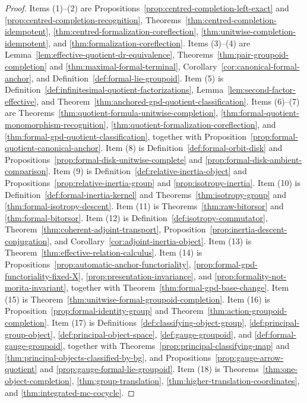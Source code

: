 \begin{proof}
Items (1)--(2) are
Propositions~\ref{prop:centred-completion-left-exact} and
\ref{prop:centred-completion-recognition},
Theorems~\ref{thm:centred-completion-idempotent},
\ref{thm:centred-formalization-coreflection},
\ref{thm:unitwise-completion-idempotent}, and
\ref{thm:formalization-coreflection}.
Items (3)--(4) are
Lemma~\ref{lem:effective-quotient-dr-equivalence},
Theorems~\ref{thm:pair-groupoid-completion} and
\ref{thm:maximal-formal-terminal},
Corollary~\ref{cor:canonical-formal-anchor}, and
Definition~\ref{def:formal-lie-groupoid}.
Item (5) is
Definition~\ref{def:infinitesimal-quotient-factorizations},
Lemma~\ref{lem:second-factor-effective}, and
Theorem~\ref{thm:anchored-gpd-quotient-classification}.
Items (6)--(7) are
Theorems~\ref{thm:quotient-formula-unitwise-completion},
\ref{thm:formal-quotient-monomorphism-recognition},
\ref{thm:quotient-formalization-coreflection}, and
\ref{thm:formal-gpd-quotient-classification}, together with
Proposition~\ref{prop:formal-quotient-canonical-anchor}.
Item (8) is
Definition~\ref{def:formal-orbit-disk} and
Propositions~\ref{prop:formal-disk-unitwise-complete} and
\ref{prop:formal-disk-ambient-comparison}.
Item (9) is
Definition~\ref{def:relative-inertia-object} and
Propositions~\ref{prop:relative-inertia-group} and
\ref{prop:isotropy-inertia}.
Item (10) is
Definition~\ref{def:formal-inertia-kernel} and
Theorems~\ref{thm:isotropy-group} and
\ref{thm:formal-isotropy-descent}.
Item (11) is
Theorems~\ref{thm:raw-bitorsor} and
\ref{thm:formal-bitorsor}.
Item (12) is
Definition~\ref{def:isotropy-commutator},
Theorem~\ref{thm:coherent-adjoint-transport},
Proposition~\ref{prop:inertia-descent-conjugation}, and
Corollary~\ref{cor:adjoint-inertia-object}.
Item (13) is
Theorem~\ref{thm:effective-relation-calculus}.
Item (14) is
Propositions~\ref{prop:automatic-anchor-functoriality},
\ref{prop:formal-gpd-functoriality-fixed-X},
\ref{prop:presentation-invariance}, and
\ref{prop:formality-not-morita-invariant}, together with
Theorem~\ref{thm:formal-gpd-base-change}.
Item (15) is
Theorem~\ref{thm:unitwise-formal-groupoid-completion}.
Item (16) is
Proposition~\ref{prop:formal-identity-group} and
Theorem~\ref{thm:action-groupoid-completion}.
Item (17) is
Definitions~\ref{def:classifying-object-group},
\ref{def:principal-group-object},
\ref{def:principal-object-space},
\ref{def:gauge-groupoid}, and
\ref{def:formal-gauge-groupoid}, together with
Theorems~\ref{prop:principal-classifying-map} and
\ref{thm:principal-objects-classified-by-bg}, and
Propositions~\ref{prop:gauge-arrow-quotient} and
\ref{prop:gauge-formal-lie-groupoid}.
Item (18) is
Theorems~\ref{thm:one-object-completion},
\ref{thm:group-translation},
\ref{thm:higher-translation-coordinates}, and
\ref{thm:integrated-mc-cocycle}.
\end{proof}


